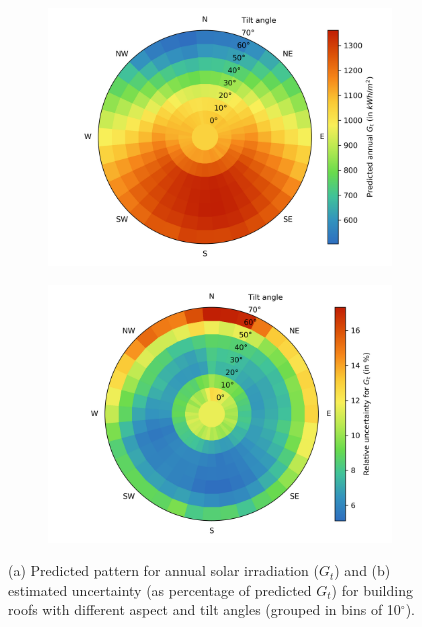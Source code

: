 \begin{figure}[tb]
\centering
\begin{subfigure}{.49\textwidth}
  \centering
  \includegraphics[width=\linewidth]{images/Figs/prediction_tilt_aspect.png}
  \subcaption{}
  \label{fig:chile_tiltIrrad}
\end{subfigure}
\begin{subfigure}{.49\textwidth}
  \centering
  \includegraphics[width=\linewidth]{images/Figs/total_std_perc_tilt_aspect.png}  
  \subcaption{}
  \label{fig:chile_unc}
\end{subfigure}
\caption{(a) Predicted pattern for annual solar irradiation ($G_t$) and (b) estimated uncertainty (as percentage of predicted $G_t$) for building roofs with different aspect and tilt angles (grouped in bins of 10$^\circ$).}
\end{figure}

